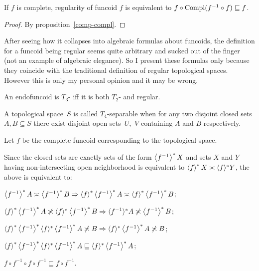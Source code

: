 \begin{prop}
If $f$ is complete, regularity of funcoid $f$ is equivalent to $f \circ
\operatorname{Compl} (f^{- 1} \circ f) \sqsubseteq f$.
\end{prop}

\begin{proof}
  By proposition~\ref{comp-compl}.
\end{proof}

\begin{rem}
After seeing how it collapses into algebraic formulas about funcoids, the
definition for a funcoid being regular seems quite arbitrary and sucked out of
the finger (not an example of algebraic elegance). So I present these formulas
only because they coincide with the traditional definition of regular
topological spaces. However this is only my personal opinion and it may be
wrong.
\end{rem}


\begin{defn}
An endofuncoid is $T_{3}$- iff it is both $T_{2}$- and regular.
\end{defn}

A topological space~$S$ is called $T_4$-separable when for any two disjoint closed sets $A,B\subseteq S$
there exist disjoint open sets~$U$,~$V$ containing $A$ and $B$ respectively.

Let $f$ be the complete funcoid corresponding to the topological space.

Since the closed sets are exactly sets of the form $\left\langle f^{- 1}\right\rangle ^{\ast} X$ and sets $X$ and $Y$ having non-intersecting open
neighborhood is equivalent to $\left\langle f\right\rangle ^{\ast} X \asymp \langle f
\rangle^{\ast} Y$, the above is equivalent to:

$\left\langle f^{-1}\right\rangle ^{\ast} A \asymp \left\langle f^{-1}\right\rangle ^{\ast} B
\Rightarrow \left\langle f\right\rangle ^{\ast} \left\langle f^{-1}\right\rangle ^{\ast} A \asymp
\left\langle f\right\rangle ^{\ast} \left\langle f^{-1}\right\rangle ^{\ast} B$;

$\left\langle f\right\rangle ^{\ast} \left\langle f^{-1}\right\rangle ^{\ast} A \not\asymp \langle f
\rangle^{\ast} \left\langle f^{-1}\right\rangle ^{\ast} B \Rightarrow \langle f^{- 1}
\rangle^{\ast} A \not\asymp \left\langle f^{-1}\right\rangle ^{\ast} B$;

$\left\langle f\right\rangle ^{\ast} \left\langle f^{-1}\right\rangle ^{\ast} \langle f
\rangle^{\ast} \left\langle f^{-1}\right\rangle ^{\ast} A \not\asymp B \Rightarrow \langle
f \rangle^{\ast} \left\langle f^{-1}\right\rangle ^{\ast} A \not\asymp B$;

$\left\langle f\right\rangle ^{\ast} \left\langle f^{-1}\right\rangle ^{\ast} \langle f
\rangle^{\ast} \left\langle f^{-1}\right\rangle ^{\ast} A \sqsubseteq \langle f
\rangle^{\ast} \left\langle f^{-1}\right\rangle ^{\ast} A$;

$f \circ f^{- 1} \circ f \circ f^{- 1} \sqsubseteq f \circ f^{- 1}$.

